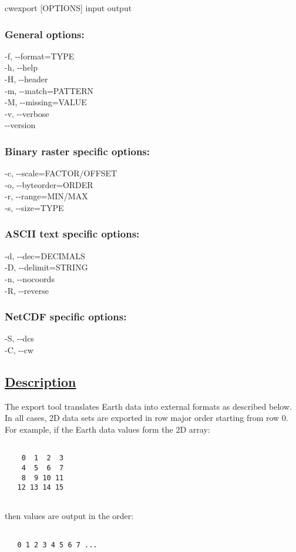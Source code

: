  cwexport [OPTIONS] input output
\subsubsection*{General options:}


  -f, -{-}format=TYPE \\ 
 -h, -{-}help \\ 
 -H, -{-}header \\ 
 -m, -{-}match=PATTERN \\ 
 -M, -{-}missing=VALUE \\ 
 -v, -{-}verbose \\ 
 -{-}version \\ 

\subsubsection*{Binary raster specific options:}


  -c, -{-}scale=FACTOR/OFFSET \\ 
 -o, -{-}byteorder=ORDER \\ 
 -r, -{-}range=MIN/MAX \\ 
 -s, -{-}size=TYPE \\ 

\subsubsection*{ASCII text specific options:}


  -d, -{-}dec=DECIMALS \\ 
 -D, -{-}delimit=STRING \\ 
 -n, -{-}nocoords \\ 
 -R, -{-}reverse \\ 

\subsubsection*{NetCDF specific options:}


  -S, -{-}dcs \\ 
 -C, -{-}cw \\ 

\subsection*{\underline{Description}}


  The export tool translates Earth data into external formats as described below. In all cases, 2D data sets are exported in row major order starting from row 0. For example, if the Earth data values form the 2D array: \begin{verbatim}

    0  1  2  3
    4  5  6  7
    8  9 10 11
   12 13 14 15
 
\end{verbatim}
 then values are output in the order: \begin{verbatim}

   0 1 2 3 4 5 6 7 ...
 
\end{verbatim}



